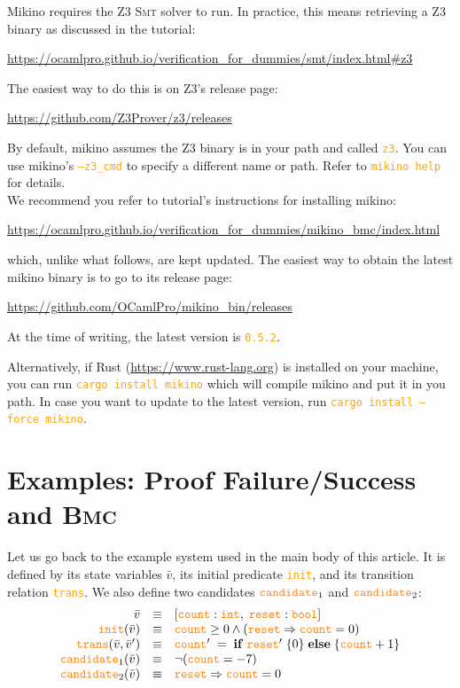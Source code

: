 \documentclass{easychair}
\newcommand{\Mkn}{Mikino}
\newcommand{\mkn}{mikino}
\newcommand{\rust}{Rust}
\newcommand{\smt}{\textsc{Smt}}
\newcommand{\bmc}{\textsc{Bmc}}
\newcommand{\mbld}[1]{\mathbf{#1}}
\newcommand{\code}[1]{\textcolor{orange}{\texttt{#1}}}
\newcommand{\vars}{\bar{v}}
\newcommand{\tyint}{\code{int}}
\newcommand{\tybool}{\code{bool}}
\newcommand{\init}{\code{init}}
\newcommand{\trans}{\code{trans}}
\newcommand{\cand}{\code{candidate}}
\newcommand{\impl}{\Rightarrow}
\begin{document}
\Mkn{} requires the Z3 \smt{} solver to run. In practice, this means retrieving a Z3 binary as
discussed in the tutorial:
%
\begin{center}
    \url{https://ocamlpro.github.io/verification_for_dummies/smt/index.html\#z3}
\end{center}
%
The easiest way to do this is on Z3's release page:
%
\begin{center}
    \url{https://github.com/Z3Prover/z3/releases}
\end{center}
%
By default, \mkn{} assumes the Z3 binary is in your path and called \code{z3}. You can use \mkn{}'s
\code{--z3\_cmd} to specify a different name or path. Refer to \code{mikino help} for details.
%
\\
%
We recommend you refer to tutorial's instructions for installing \mkn{}:
%
\begin{center}
    \url{https://ocamlpro.github.io/verification_for_dummies/mikino_bmc/index.html}%
\end{center}
%
which, unlike what follows, are kept updated. The easiest way to obtain the latest \mkn{} binary is
to go to its release page:
%
\begin{center}
    \url{https://github.com/OCamlPro/mikino_bin/releases}
\end{center}
%
At the time of writing, the latest version is \code{0.5.2}.

Alternatively, if \rust{} (\url{https://www.rust-lang.org}) is installed on your machine, you can
run \code{cargo install mikino} which will compile \mkn{} and put it in you path. In case you want
to update to the latest version, run \code{cargo install --force mikino}.

\section{Examples: Proof Failure/Success and \bmc{}}%
\label{app:example}

Let us go back to the example system used in the main body of this article. It is defined by its
state variables \(\vars\), its initial predicate \init{}, and its transition relation \trans{}.
We also define two candidates \(\cand_1\) and \(\cand_2\):
%
\[\begin{array}{r c l}
    \vars
        & \equiv
        & [ \code{count}: \tyint,\; \code{reset}: \tybool ]
    \\
    \init(\vars)
        & \equiv
        & \code{count} \geq 0 \land (\code{reset} \impl \code{count} = 0)
    \\
    \trans(\vars, \vars')
        & \equiv
        & \code{count}' \;=\;
            \mbld{if} \; \code{reset}' \; \{ 0 \} \;
            \mbld{else} \; \{ \code{count} + 1 \}
    \\
    \cand_1(\vars)
        & \equiv
        & \neg(\code{count} = -7)
    \\
    \cand_2(\vars)
        & \equiv
        & \code{reset} \impl \code{count} = 0
    \\
\end{array}\]
\end{document}
